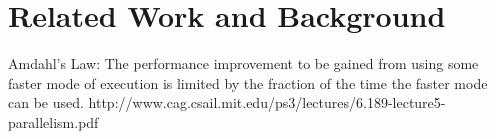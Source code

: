 \label{ch:literature_review}

\section{Related Work and Background} %
\label{sec:related_work_and_background}






Amdahl's Law: The performance improvement to be gained from using some faster
mode of execution is limited by the fraction of the time the faster mode can be
used.
http://www.cag.csail.mit.edu/ps3/lectures/6.189-lecture5-parallelism.pdf



